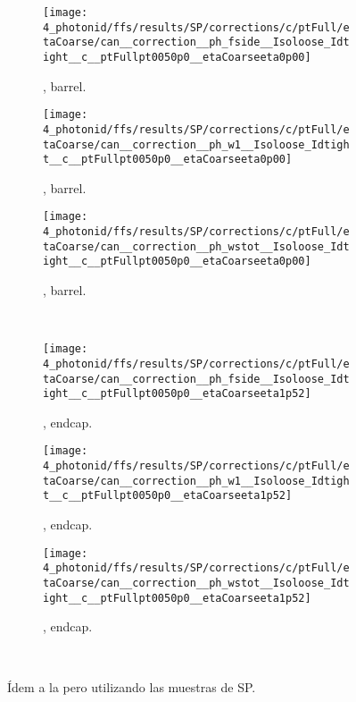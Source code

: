 \begin{figure}[ht!]
    \centering
    \begin{subfigure}[h]{0.32\linewidth}
        \centering
        \texttt{[image: 4\_photonid/ffs/results/SP/corrections/c/ptFull/etaCoarse/can\_\_correction\_\_ph\_fside\_\_Isoloose\_Idtight\_\_c\_\_ptFullpt0050p0\_\_etaCoarseeta0p00]}
        \caption{\fside, barrel.}
    \end{subfigure}
    \hfill
    \begin{subfigure}[h]{0.32\linewidth}
        \centering
        \texttt{[image: 4\_photonid/ffs/results/SP/corrections/c/ptFull/etaCoarse/can\_\_correction\_\_ph\_w1\_\_Isoloose\_Idtight\_\_c\_\_ptFullpt0050p0\_\_etaCoarseeta0p00]}
        \caption{\wone, barrel.}
    \end{subfigure}
    \hfill
    \begin{subfigure}[h]{0.32\linewidth}
        \centering
        \texttt{[image: 4\_photonid/ffs/results/SP/corrections/c/ptFull/etaCoarse/can\_\_correction\_\_ph\_wstot\_\_Isoloose\_Idtight\_\_c\_\_ptFullpt0050p0\_\_etaCoarseeta0p00]}
        \caption{\wstot, barrel.}
    \end{subfigure}\\
    \begin{subfigure}[h]{0.32\linewidth}
        \centering
        \texttt{[image: 4\_photonid/ffs/results/SP/corrections/c/ptFull/etaCoarse/can\_\_correction\_\_ph\_fside\_\_Isoloose\_Idtight\_\_c\_\_ptFullpt0050p0\_\_etaCoarseeta1p52]}
        \caption{\fside, endcap.}
    \end{subfigure}
    \hfill
    \begin{subfigure}[h]{0.32\linewidth}
        \centering
        \texttt{[image: 4\_photonid/ffs/results/SP/corrections/c/ptFull/etaCoarse/can\_\_correction\_\_ph\_w1\_\_Isoloose\_Idtight\_\_c\_\_ptFullpt0050p0\_\_etaCoarseeta1p52]}
        \caption{\wone, endcap.}
    \end{subfigure}
    \hfill
    \begin{subfigure}[h]{0.32\linewidth}
        \centering
        \texttt{[image: 4\_photonid/ffs/results/SP/corrections/c/ptFull/etaCoarse/can\_\_correction\_\_ph\_wstot\_\_Isoloose\_Idtight\_\_c\_\_ptFullpt0050p0\_\_etaCoarseeta1p52]}
        \caption{\wstot, endcap.}
    \end{subfigure}\\
    \caption{\'Idem a la \Fig{\ref{fig:ss_corrections:ffs:results:ss_rz}} pero utilizando las muestras de \ac{SP}.}
    \label{fig:ss_corrections:ffs:results:ss_sp}
\end{figure}
























